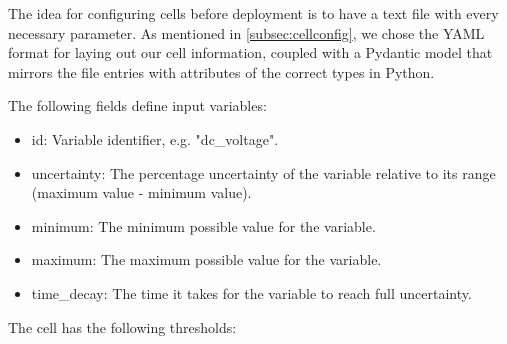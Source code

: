 The idea for configuring cells before deployment is to have a text file with every necessary parameter. As mentioned in \ref{subsec:cellconfig}, we chose the YAML format for laying out our cell information, coupled with a Pydantic \cite{pydantic} model that mirrors the file entries with attributes of the correct types in Python.

The following fields define input variables:
\begin{itemize}
    \item id: Variable identifier, e.g. "dc\_voltage".
    \item uncertainty: The percentage uncertainty of the variable relative to its range (maximum value - minimum value).
    \item minimum: The minimum possible value for the variable.
    \item maximum: The maximum possible value for the variable.
    \item time\_decay: The time it takes for the variable to reach full uncertainty.
\end{itemize}

The cell has the following thresholds:

